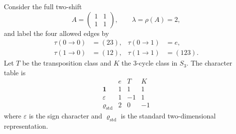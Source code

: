 Consider the full two-shift
\[
  A=
  \begin{pmatrix}
    1 & 1 \\
    1 & 1
  \end{pmatrix},
  \qquad
  \lambda=\rho(A)=2,
\]
and label the four allowed edges by
\begin{equation}\label{eq:s3-example-edge-labels}
  \begin{aligned}
    \tau(0\to 0)&=(23), & \tau(0\to 1)&=e, \\
    \tau(1\to 0)&=(12), & \tau(1\to 1)&=(123).
  \end{aligned}
\end{equation}
Let \(T\) be the transposition class and \(K\) the \(3\)-cycle class in
\(S_3\). The character table is
\begin{equation}\label{eq:s3-character-table}
  \begin{array}{c|ccc}
    & e & T & K \\ \hline
    \mathbf 1 & 1 & 1 & 1 \\
    \varepsilon & 1 & -1 & 1 \\
    \varrho_{\mathrm{std}} & 2 & 0 & -1
  \end{array}
\end{equation}
where \(\varepsilon\) is the sign character and \(\varrho_{\mathrm{std}}\) is the
standard two-dimensional representation.


